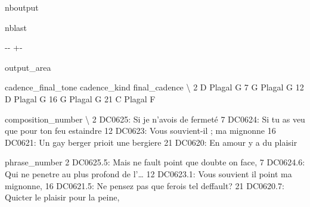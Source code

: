 \documentclass[letterpaper,10pt,english]{sphinxmanual}
\newlength\nbsphinxcodecellspacing
\begin{document}
\begin{sphinxuseclass}{nboutput}
\begin{sphinxuseclass}{nblast}
{

\kern-\sphinxverbatimsmallskipamount\kern-\baselineskip
\kern+\FrameHeightAdjust\kern-\fboxrule
\vspace{\nbsphinxcodecellspacing}

\begin{sphinxuseclass}{output_area}
\begin{sphinxuseclass}{}


\begin{sphinxVerbatim}[commandchars=\\\{\}]
\llap{\color{nbsphinxout}[33]:\,\hspace{\fboxrule}\hspace{\fboxsep}}   cadence\_final\_tone cadence\_kind final\_cadence  \textbackslash{}
2                   D       Plagal             G
7                   G       Plagal             G
12                  D       Plagal             G
16                  G       Plagal             G
21                  C       Plagal             F

                                 composition\_number  \textbackslash{}
2                  DC0625: Si je n'avois de fermeté
7   DC0624: Si tu as veu que pour ton feu estaindre
12           DC0623: Vous souvient-il ; ma mignonne
16        DC0621: Un gay berger prioit une bergiere
21                  DC0620: En amour y a du plaisir

                                        phrase\_number
2   DC0625.5: Mais ne fault point que doubte on face,
7   DC0624.6: Qui ne penetre au plus profond de l'{\ldots}
12      DC0623.1: Vous souvient il point ma mignonne,
16   DC0621.5: Ne pensez pas que ferois tel deffault?
21        DC0620.7: Quicter le plaisir pour la peine,
\end{sphinxVerbatim}



\end{sphinxuseclass}
\end{sphinxuseclass}
}

\end{sphinxuseclass}
\end{sphinxuseclass}
\end{document}
